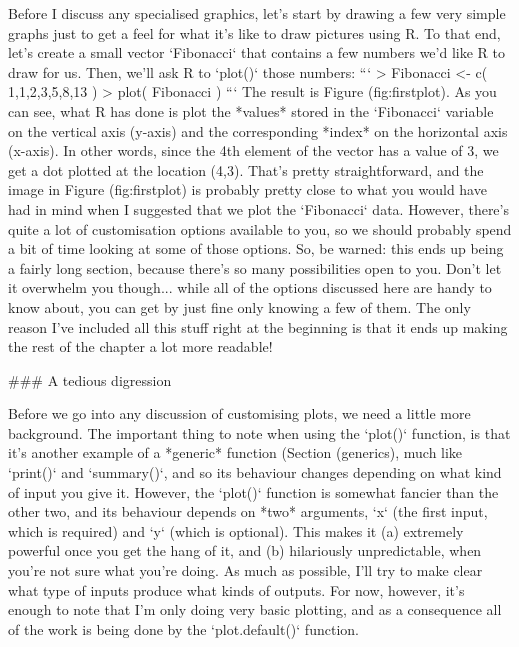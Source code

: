 Before I discuss any specialised graphics, let's start by drawing a few very simple graphs just to get a feel for what it's like to draw pictures using R. To that end, let's create a small vector `Fibonacci` that contains a few numbers we'd like R to draw for us. Then, we'll ask R to `plot()` those numbers:
```
> Fibonacci <- c( 1,1,2,3,5,8,13 )
> plot( Fibonacci )
```
The result is Figure \@ref(fig:firstplot). As you can see, what R has done is plot the *values* stored in the `Fibonacci` variable on the vertical axis (y-axis) and the corresponding *index* on the horizontal axis (x-axis). In other words, since the 4th element of the vector has a value of 3, we get a dot plotted at the location (4,3). That's pretty straightforward, and the image in Figure \@ref(fig:firstplot) is probably pretty close to what you would have had in mind when I suggested that we plot the `Fibonacci` data. However, there's quite a lot of customisation options available to you, so we should probably spend a bit of time looking at some of those options. So, be warned: this ends up being a fairly long section, because there's so many possibilities open to you. Don't let it overwhelm you though... while all of the options discussed here are handy to know about, you can get by just fine only knowing a few of them. The only reason I've included all this stuff right at the beginning is that it ends up making the rest of the chapter a lot more readable!



### A tedious digression

Before we go into any discussion of customising plots, we need a little more background. The important thing to note when using the `plot()` function, is that it's another example of a *generic* function (Section \@ref(generics), much like `print()` and `summary()`, and so its behaviour changes depending on what kind of input you give it. However, the `plot()` function is somewhat fancier than the other two, and its behaviour depends on *two* arguments, `x` (the first input, which is required) and `y` (which is optional). This makes it (a) extremely powerful once you get the hang of it, and (b) hilariously unpredictable, when you're not sure what you're doing. As much as possible, I'll try to make clear what type of inputs produce what kinds of outputs. For now, however, it's enough to note that I'm only doing very basic plotting, and as a consequence all of the work is being done by the `plot.default()` function.

